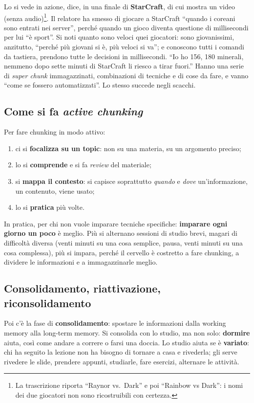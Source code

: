 Lo si vede in azione, dice, in una finale di \textbf{StarCraft}, di cui
mostra un video (senza audio)\footnote{La trascrizione riporta ``Raynor vs.\
Dark'' e poi ``Rainbow vs Dark'': i nomi dei due giocatori non sono
ricostruibili con certezza.}. Il relatore ha smesso di giocare a StarCraft
``quando i coreani sono entrati nei server'', perché quando un gioco diventa
questione di millisecondi per lui ``è sport''. Si noti quanto sono veloci
quei giocatori: sono giovanissimi, anzitutto, ``perché più giovani si è,
più veloci si va''; e conoscono tutti i comandi da tastiera, prendono tutte
le decisioni in millisecondi. ``Io ho 156, 180 minerali, nemmeno dopo sette
minuti di StarCraft li riesco a tirar fuori.'' Hanno una serie di
\emph{super chunk} immagazzinati, combinazioni di tecniche e di cose da
fare, e vanno ``come se fossero automatizzati''. Lo stesso succede negli
scacchi.

\subsection{Come si fa \emph{active chunking}}

Per fare chunking in modo attivo:
\begin{enumerate}
  \item ci si \textbf{focalizza su un topic}: non su una materia, su un
        argomento preciso;
  \item lo si \textbf{comprende} e si fa \emph{review} del materiale;
  \item si \textbf{mappa il contesto}: si capisce soprattutto
        \emph{quando} e \emph{dove} un'informazione, un contenuto, viene
        usato;
  \item lo si \textbf{pratica} più volte.
\end{enumerate}
In pratica, per chi non vuole imparare tecniche specifiche: \textbf{imparare
ogni giorno un poco} è meglio. Più si alternano sessioni di studio brevi,
magari di difficoltà diversa (venti minuti su una cosa semplice, pausa,
venti minuti su una cosa complessa), più si impara, perché il cervello è
costretto a fare chunking, a dividere le informazioni e a immagazzinarle
meglio.

\subsection{Consolidamento, riattivazione, riconsolidamento}

Poi c'è la fase di \textbf{consolidamento}: spostare le informazioni dalla
working memory alla long-term memory. Si consolida con lo studio, ma non
solo: \textbf{dormire} aiuta, così come andare a correre o farsi una
doccia. Lo studio aiuta se è \textbf{variato}: chi ha seguito la lezione
non ha bisogno di tornare a casa e rivederla; gli serve rivedere le slide,
prendere appunti, studiarle, fare esercizi, alternare le attività.

